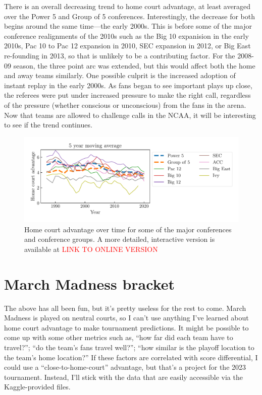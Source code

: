 \documentclass[twocolumn]{aastex63}
\begin{document}
There is an overall decreasing trend to home court advantage, at least averaged over the Power 5 and Group of 5 conferences.
Interestingly, the decrease for both begins around the same time---the early 2000s.
This is before some of the major conference realignments of the 2010s such as the Big 10 expanision in the early 2010s, Pac 10 to Pac 12 expansion in 2010, SEC expansion in 2012, or Big East re-founding in 2013, so that is unlikely to be a contributing factor.
For the 2008-09 season, the three point arc was extended, but this would affect both the home and away teams similarly.
One possible culprit is the increased adoption of instant replay in the early 2000s.
As fans began to see important plays up close, the referees were put under increased pressure to make the right call, regardless of the pressure (whether conscious or unconscious) from the fans in the arena.
Now that teams are allowed to challenge calls in the NCAA, it will be interesting to see if the trend continues.

\begin{figure}
\centering
\includegraphics[width=6in]{figs/homecourtadvantage_vs_year.pdf}
\caption{Home court advantage over time for some of the major conferences and conference groups. A more detailed, interactive version is available at \textcolor{red}{LINK TO ONLINE VERSION}}
\label{fig:homecourtadvantage_vs_year}
\end{figure}

\section{March Madness bracket}
\label{sect:marchmadness}
The above has all been fun, but it's pretty useless for the rest to come.
March Madness is played on neutral courts, so I can't use anything I've learned about home court advantage to make tournament predictions.
It might be possible to come up with some other metrics such as, ``how far did each team have to travel?''; ``do the team's fans travel well?''; ``how similar is the playoff location to the team's home location?''
If these factors are correlated with score differential, I could use a ``close-to-home-court'' advantage, but that's a project for the 2023 tournament.
Instead, I'll stick with the data that are easily accessible via the Kaggle-provided files.
\end{document}
